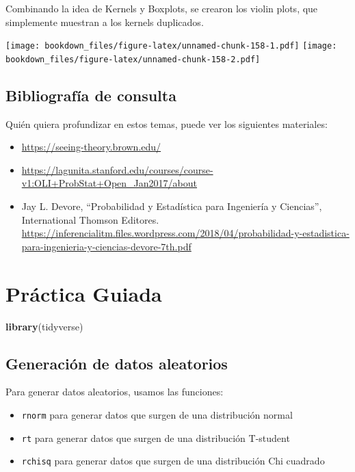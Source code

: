 \documentclass[]{book}
\newenvironment{Shaded}{\begin{snugshade}}{\end{snugshade}}
\newcommand{\KeywordTok}[1]{\textcolor[rgb]{0.13,0.29,0.53}{\textbf{#1}}}
\newcommand{\NormalTok}[1]{#1}
\providecommand{\tightlist}{%
  \setlength{\itemsep}{0pt}\setlength{\parskip}{0pt}}
\begin{document}
Combinando la idea de Kernels y Boxplots, se crearon los violin plots, que simplemente muestran a los kernels duplicados.

\texttt{[image: bookdown\_files/figure-latex/unnamed-chunk-158-1.pdf]} \texttt{[image: bookdown\_files/figure-latex/unnamed-chunk-158-2.pdf]}

\hypertarget{bibliografia-de-consulta-1}{%
\subsection{Bibliografía de consulta}\label{bibliografia-de-consulta-1}}

Quién quiera profundizar en estos temas, puede ver los siguientes materiales:

\begin{itemize}
\tightlist
\item
  \url{https://seeing-theory.brown.edu/}
\item
  \url{https://lagunita.stanford.edu/courses/course-v1:OLI+ProbStat+Open_Jan2017/about}
\item
  Jay L. Devore, ``Probabilidad y Estadística para Ingeniería y Ciencias'', International Thomson Editores. \url{https://inferencialitm.files.wordpress.com/2018/04/probabilidad-y-estadistica-para-ingenieria-y-ciencias-devore-7th.pdf}
\end{itemize}

\hypertarget{practica-guiada-6}{%
\section{Práctica Guiada}\label{practica-guiada-6}}

\begin{Shaded}
\begin{Highlighting}[]
\KeywordTok{library}\NormalTok{(tidyverse)}
\end{Highlighting}
\end{Shaded}

\hypertarget{generacion-de-datos-aleatorios}{%
\subsection{Generación de datos aleatorios}\label{generacion-de-datos-aleatorios}}

Para generar datos aleatorios, usamos las funciones:

\begin{itemize}
\tightlist
\item
  \texttt{rnorm} para generar datos que surgen de una distribución normal
\item
  \texttt{rt} para generar datos que surgen de una distribución T-student
\item
  \texttt{rchisq} para generar datos que surgen de una distribución Chi cuadrado
\end{itemize}
\end{document}
